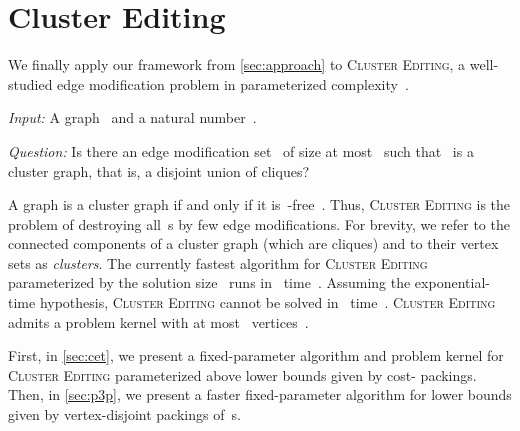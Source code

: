 \documentclass[envcountsame,numbook,smallextended]{svjour3}
\numberwithin{equation}{section}
\numberwithin{figure}{section}
\newcommand{\decprob}[3]{\pagebreak[3]
  \begin{problem}[\boldmath#1]
    \begin{compactdesc}
        \item[\normalfont\it Input:] #2
        \item[\normalfont\it Question:] #3
    \end{compactdesc}
  \end{problem}
}
\begin{document}
\section{Cluster Editing}
\label{sec:cluster-edit}
We finally apply our framework from \cref{sec:approach} to \textsc{Cluster Editing}, a well-studied edge modification problem in parameterized complexity~\cite{Boeck12,CM12,FKP+11,KU12}. \decprob{\textsc{Cluster Editing}}{A graph~ and a natural number~.}  {Is there an edge modification set~ of size at most~ such that~ is a cluster graph, that is, a disjoint union of cliques?}  A graph is a cluster graph if and only if it is~-free~\cite{SST04}. Thus, \textsc{Cluster Editing} is the problem of destroying all~s by few edge modifications. For brevity, we refer to the connected components of a cluster graph (which are cliques) and to their vertex sets as \emph{clusters}. The currently fastest algorithm for
\textsc{Cluster Editing} parameterized by the solution size~ runs in~ time~\cite{Boeck12}.
Assuming the
exponential-time hypothesis, \textsc{Cluster Editing} cannot be solved
in~ time~\cite{FKP+11,KU12}. \textsc{Cluster
  Editing} admits a problem kernel with at most~
vertices~\cite{CM12}.

First, in \cref{sec:cet}, we present a fixed-parameter algorithm and problem kernel for \textsc{Cluster Editing} parameterized above lower bounds given by cost- packings.  Then, in \cref{sec:p3p}, we present a faster fixed-parameter algorithm for lower bounds given by vertex-disjoint packings of~s.
\end{document}
